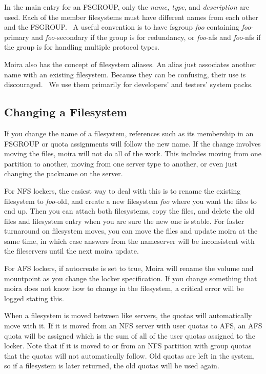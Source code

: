 In the main entry for an FSGROUP, only the {\em name, type}, and
{\em description} are used.  Each of the member filesystems must have
different names from each other and the FSGROUP.  \athena\ A useful
convention is to have fsgroup {\em foo} containing {\em foo}-primary and
{\em foo}-secondary if the group is for redundancy, or {\em foo}-afs and
{\em foo}-nfs if the group is for handling multiple protocol types.

Moira also has the concept of filesystem aliases.    An alias just associates another name with an existing
filesystem.  Because they can be confusing, their use is discouraged.
\athena\ We use them primarily for developers' and testers' system
packs.


\subsection{Changing a Filesystem}

If you change the name of a filesystem, references such as its
membership in an FSGROUP or quota assignments will follow the new
name.  If the change involves moving the files, moira will not do all
of the work.  This includes moving from one partition to another,
moving from one server type to another, or even just changing the
packname on the server.

For NFS lockers, the easiest way to deal with this is to rename the
existing filesystem to {\em foo}-old, and create a new filesystem {\em
foo} where you want the files to end up.  Then you can attach both
filesystems, copy the files, and delete the old files and filesystem
entry when you are sure the new one is stable.  For faster turnaround
on filesystem moves, you can move the files and update moira at the
same time, in which case answers from the nameserver will be
inconsistent with the fileservers until the next moira update.

For AFS lockers, if autocreate is set to true, Moira will rename the
volume and mountpoint as you change the locker specification.  If you
change something that moira does not know how to change in the
filesystem, a critical error will be logged stating this.

When a filesystem is moved between like servers, the quotas will
automatically move with it.  If it is moved from an NFS server with
user quotas to AFS, an AFS quota will be assigned which is the sum of
all of the user quotas assigned to the locker.  Note that if it is
moved to or from an NFS partition with group quotas that the quotas
will not automatically follow.  Old quotas are left in the system, so
if a filesystem is later returned, the old quotas will be used again.

